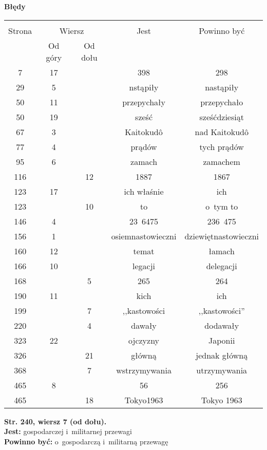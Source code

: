 \documentclass[a4paper,11pt]{article}
\newcommand{\tb}{\textbf}
\newcommand{\noi}{\noindent}
\newcommand{\Center}[1]{\begin{center} #1 \end{center}}
\newcommand{\CenterTB}[1]{\Center{\tb{#1}}}
\newcommand{\StrWd}[2]{\tb{Str. #1, wiersz #2 (od dołu).}}
\newcommand{\Jest}{\tb{Jest: }}
\newcommand{\Pow}{\tb{Powinno być: }}
\begin{document}
\CenterTB{Błędy}
\begin{center}
  \begin{tabular}{|c|c|c|c|c|}
    \hline
    & \multicolumn{2}{c|}{} & & \\
    Strona & \multicolumn{2}{c|}{Wiersz}& Jest & Powinno być \\ \cline{2-3}
    & Od góry & Od dołu &  &  \\ \hline
    7 & 17 & & 398 & 298 \\
    29 & 5 & & nstąpiły & nastąpiły \\
    50 & 11 & & przepychały & przepychało \\
    50 & 19 & & sześć & sześćdziesiąt \\
    67 & 3 & & Kaitokud\^{o} & nad Kaitokud\^{o} \\
    77 & 4 & & prądów & tych prądów \\
    95 & 6 & & zamach & zamachem \\
    116 & & 12 & 1887 & 1867 \\
    123 & 17 & & ich właśnie & ich \\
    123 & & 10 & to & o~tym to \\
    146 & 4 & & 23~6475 & 236~475 \\
    156 & 1 & & osiemnastowieczni & dziewiętnastowieczni \\
    160 & 12 & & temat & łamach \\
    166 & 10 & & legacji & delegacji \\
    168 & & 5 & 265 & 264 \\
    190 & 11 & & kich & ich \\
    199 & & 7 & ,,kastowości %
           & ,,kastowości'' \\
    220 & & 4 & dawały & dodawały \\
    323 & 22 & & ojczyzny & Japonii \\
    326 & & 21 & główną & jednak główną \\
    368 & & 7 & wstrzymywania & utrzymywania \\
    465 & 8 & & 56 & 256 \\
    465 & & 18 & Tokyo1963 & Tokyo 1963 \\
    \hline
  \end{tabular}
\end{center}
\noi
\StrWd{240}{7} \\
\Jest gospodarczej i~militarnej przewagi \\
\Pow o~gospodarczą i~militarną przewagę \\
\end{document}

